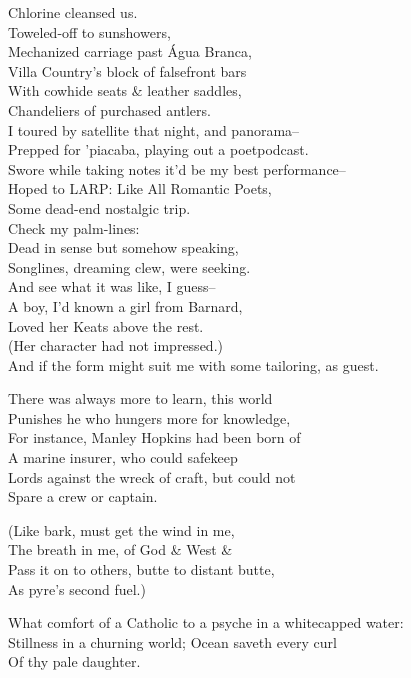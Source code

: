 
Chlorine cleansed us. \\
Toweled-off to sunshowers, \\
Mechanized carriage past Água Branca, \\
Villa Country's block of falsefront bars \\
With cowhide seats \& leather saddles, \\
Chandeliers of purchased antlers. \\
I toured by satellite that night, and panorama-- \\
Prepped for 'piacaba, playing out a poetpodcast. \\ 
Swore while taking notes it'd be my best performance-- \\ 
Hoped to LARP: Like All Romantic Poets, \\
Some dead-end nostalgic trip. \\
Check my palm-lines: \\
Dead in sense but somehow speaking, \\
Songlines, dreaming clew, were seeking. \\
And see what it was like, I guess-- \\
A boy, I'd known a girl from Barnard, \\ 
Loved her Keats above the rest. \\
(Her character had not impressed.) \\ 
And if the form might suit me with some tailoring, as guest.

There was always more to learn, this world \\
Punishes he who hungers more for knowledge, \\
For instance, Manley Hopkins had been born of \\
A marine insurer, who could safekeep \\
Lords against the wreck of craft, but could not \\
Spare a crew or captain.

(Like bark, must get the wind in me, \\
The breath in me, of God \& West \& \\
Pass it on to others, butte to distant butte, \\
As pyre's second fuel.)

What comfort of a Catholic to a psyche in a whitecapped water: \\
Stillness in a churning world; Ocean saveth every curl \\
Of thy pale daughter.

